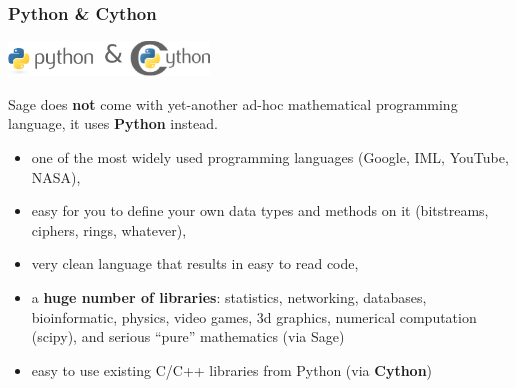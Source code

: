 \documentclass[9pt]{beamer}
\renewcommand{\emph}[1]{\textbf{\color{oxygenorange}#1}\xspace}
\begin{document}
\begin{frame}[fragile]
\frametitle{Python \& Cython}
\begin{block}{}
\centering
 \includegraphics[width=0.4\textwidth]{python-and-cython.png}
\end{block}

Sage does \emph{not} come with yet-another ad-hoc mathematical programming language, it uses
\emph{Python} instead.

\begin{itemize}
\item one of the most widely used programming languages (Google, IML, YouTube, NASA),
\item easy for you to define your own data types and methods on it (bitstreams, ciphers, rings, whatever),
\item very clean language that results in easy to read code,
\item a \emph{huge number of libraries}: statistics, networking, databases,
bioinformatic, physics, video games, 3d graphics, numerical computation (scipy),
and serious ``pure'' mathematics (via Sage)
\item easy to use existing C/C++ libraries from Python (via \emph{Cython})
\end{itemize}
\end{frame}



% 
% 
% 
% 
\end{document}
